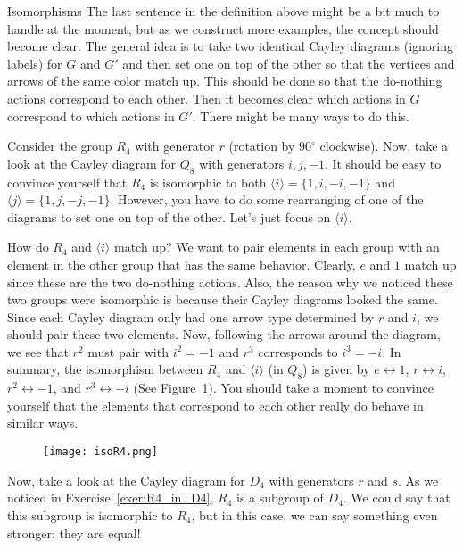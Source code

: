 \begin{section}{Isomorphisms}
The last sentence in the definition above might be a bit much to handle at the moment, but as we construct more examples, the concept should become clear.  The general idea is to take two identical Cayley diagrams (ignoring labels) for \(G\) and \(G'\) and then set one on top of the other so that the vertices and arrows of the same color match up.  This should be done so that the do-nothing actions correspond to each other.  Then it becomes clear which actions in \(G\) correspond to which actions in \(G'\).  There might be many ways to do this.

Consider the group \(R_4\) with generator \(r\) (rotation by \(90^\circ\) clockwise).  Now, take a look at the Cayley diagram for \(Q_8\) with generators \(i, j, -1\).  It should be easy to convince yourself that \(R_4\) is isomorphic to both \(\langle i\rangle=\{1,i,-i,-1\}\) and \(\langle j\rangle=\{1,j,-j,-1\}\).  However, you have to do some rearranging of one of the diagrams to set one on top of the other.  Let's just focus on \(\langle i\rangle\).  

How do \(R_4\) and \(\langle i\rangle\) match up?  We want to pair elements in each group with an element in the other group that has the same behavior.  Clearly, \(e\) and \(1\) match up since these are the two do-nothing actions.  Also, the reason why we noticed these two groups were isomorphic is because their Cayley diagrams looked the same.  Since each Cayley diagram only had one arrow type determined by \(r\) and \(i\), we should pair these two elements.  Now, following the arrows around the diagram, we see that \(r^2\) must pair with \(i^2=-1\) and \(r^3\) corresponds to \(i^3=-i\).  In summary, the isomorphism between \(R_4\) and \(\langle i\rangle\) (in \(Q_8\)) is given by \(e\leftrightarrow 1\), \(r\leftrightarrow i\), \(r^2\leftrightarrow -1\), and \(r^3\leftrightarrow -i\) (See Figure~\ref{fig:isoR4}).  You should take a moment to convince yourself that the elements that correspond to each other really do behave in similar ways.

\begin{figure}\label{fig:isoR4}
\begin{center}
\texttt{[image: isoR4.png]}
\end{center}
\end{figure}

Now, take a look at the Cayley diagram for \(D_4\) with generators \(r\) and \(s\).  As we noticed in Exercise~\ref{exer:R4_in_D4}, \(R_4\) is a subgroup of \(D_4\).  We could say that this subgroup is isomorphic to \(R_4\), but in this case, we can say something even stronger: they are equal!


\end{section}
